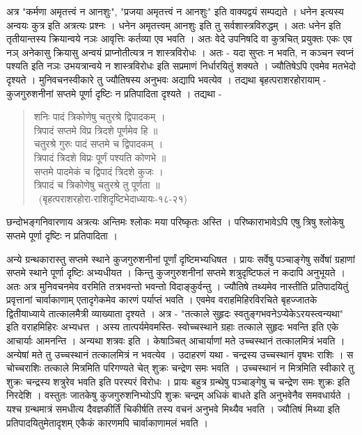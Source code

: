 अत्र "कर्मणा अमृतत्त्वं न आनशुः", "प्रजया अमृतत्त्वं न आनशुः" इति वाक्यद्वयं सम्पद्यते । धनेन इत्यस्य अन्वयः कुत्र इति अत्रत्यः प्रश्नः । धनेन अमृतत्त्वम् आनशुः इति तु सर्वशास्त्रविरुद्धम् । अतः धनेन इति तृतीयान्तस्य क्रियान्वये नञः आवृत्तिः कर्तव्या एव भवति । अतः वेदे उपनिषदि वा कुत्रचित् प्रयुक्तः एकः एव नञ् अनेकासु क्रियासु अन्वयं प्राप्नोतीत्यत्र न शास्त्रविरोधः । अतः - यदा सुप्तः न भवति, न कञ्चन स्वप्नं पश्यति इति नञः उभयत्रान्वये न शास्त्रविरोधः इति सप्रमाणं निर्धारयितुं शक्यते । ज्यौतिषेऽपि एवमेव मतभेदो दृश्यते । मुनिवचनस्वीकारे तु ज्यौतिषस्य अनुभवः अद्यापि भवत्येव । तद्यथा बृहत्पराशरहोरायाम् - कुजगुरुशनीनां सप्तमे पूर्णा दृष्टिः न प्रतिपादिता दृश्यते । तद्यथा -
\begin{verse}
शनिः पादं त्रिकोणेषु चतुरश्रे द्विपादकम् ।\\
त्रिपादं सप्तमे विप्र त्रिदशे पूर्णमेव हि ॥\\
चतुरश्रे गुरुः पादं सप्तमे च द्विपादकम् ।\\
त्रिपादं त्रिदशे विप्रः पूर्णं पश्यति कोणभे ॥\\
सप्तमे पादमेकं च द्विपादं त्रिदशे कुजः ।\\
त्रिपादं च त्रिकोणेषु चतुरश्रे तु पूर्णता ॥ \\
~\hfill(बृहत्पराशरहोरा-राशिदृष्टिभेदाध्यायः-१८-२१)
\end{verse}
छन्दोभङ्गनिवारणाय अत्रत्यः अन्तिमः श्लोकः मया परिष्कृतः अस्ति । परिष्काराभावेऽपि एषु त्रिषु श्लोकेषु सप्तमे पूर्णा दृष्टिः न प्रतिपादिता ।  

अन्ये ग्रन्थकारास्तु सप्तमे स्थाने कुजगुरुशनीनां पूर्णां दृष्टिमभ्यधिषत । प्रायः सर्वेषु पञ्चाङ्गेषु सर्वेषां ग्रहाणां सप्तमे स्थाने पूर्णा दृष्टिः अभ्यधीयत । किन्तु कुजगुरुशनीनां सप्तमे शत्रुदृष्टिफलं न कदापि अनुभूयते । अतः अत्र मुनिवचनमेव वरमिति तत्रभवन्तो भवन्तो विदाङ्कुर्वन्तु । ज्यौतिषे तथ्यमेव नास्तीति प्रतिपादयितुं प्रवृत्तानां चार्वाकाणाम् एतादृगेकमेव कारणं पर्याप्तं भवति । एवमेव वराहमिहिरविरचिते बृहज्जातके द्वितीयाध्याये तात्कालमैत्री व्याख्याता दृश्यते । अत्र - "तत्काले सुहृदः स्वतुङ्गभवनेऽप्येकेऽरयस्त्वन्यथा" इति वराहमिहिरः अभ्यधत्त । अस्य तात्पर्यमेवमस्ति- स्वोच्चस्थाने ग्रहाः तत्काले  सुहृदः भवन्ति इति एके आचार्याः आमनन्ति । अन्यथा शत्रवः इति । केषाञ्चित् आचार्याणां मते उच्चस्थानं तत्कालमित्रं भवति । अन्येषां मते तु उच्चस्थानं तत्कालमित्रं न भवत्येव । उदाहरणं यथा - चन्द्रस्य उच्चस्थानं वृषभः राशिः । स चोच्चराशिः तत्काले मित्रमिति परिगण्यते चेत् शुक्रः चन्द्रेण समः भवति । उच्चस्थानं न मित्रमिति स्वीकारे तु शुक्रः चन्द्रस्य शत्रुरेव भवति इति परस्परं विरोधः । प्रायः बहुत्र ग्रन्थेषु पञ्चाङ्गेषु च चन्द्रेण समः शुक्रः इति निरदेशि । वस्तुतः जातकेषु कुजगुरुशनिभ्योऽपि शुक्रः चन्द्रम् अधिकं बाधते इति अनुभवेनैव समवधार्यते । यश्च ग्रन्थमात्रं समधीत्य दैवज्ञकीर्तिं चिकीर्षति तस्य वचनं अनुभवे मिथ्यैव भवति । ज्यौतिषं मिथ्या इति प्रतिपादयितुमेतादृशम् एकैकं कारणमपि चार्वाकाणामलं भवति ।

